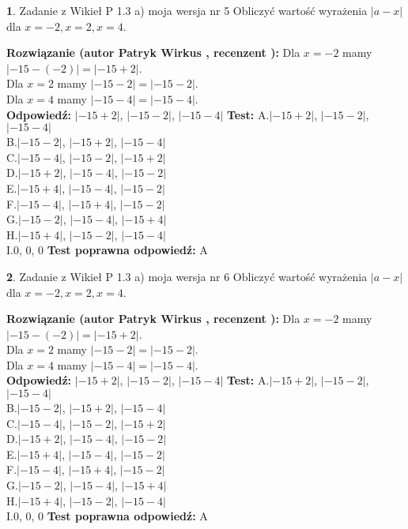 \documentclass[12pt, a4paper]{article}
\theoremstyle{definition} %
\newtheorem{zad}{}
\newcommand{\zadStart}[1]{\begin{zad}#1\newline}
\newcommand{\zadStop}{\end{zad}}
\newcommand{\rozwStart}[2]{\noindent \textbf{Rozwiązanie (autor #1 , recenzent #2): }\newline}
\newcommand{\rozwStop}{\newline}
\newcommand{\odpStart}{\noindent \textbf{Odpowiedź:}\newline}
\newcommand{\odpStop}{\newline}
\newcommand{\testStart}{\noindent \textbf{Test:}\newline}
\newcommand{\testStop}{\newline}
\newcommand{\kluczStart}{\noindent \textbf{Test poprawna odpowiedź:}\newline}
\newcommand{\kluczStop}{\newline}
\begin{document}
\zadStart{Zadanie z Wikieł P 1.3 a) moja wersja nr 5}
Obliczyć wartość wyrażenia $|a - x|$ dla $x=-2,x=2,x=4$.
\zadStop
\rozwStart{Patryk Wirkus}{}
Dla $x = -2$ mamy $|-15 - (-2)| = |-15 + 2|$.\\
Dla $x = 2$ mamy $|-15 - 2| = |-15 - 2|$.\\
Dla $x = 4$ mamy $|-15 - 4| = |-15 - 4|$.\\
\rozwStop
\odpStart
$|-15 + 2|$, $|-15 - 2|$, $|-15 - 4|$
\odpStop
\testStart
A.$|-15 + 2|$, $|-15 - 2|$, $|-15 - 4|$\\
B.$|-15 - 2|$, $|-15 + 2|$, $|-15 - 4|$\\
C.$|-15 - 4|$, $|-15 - 2|$, $|-15 + 2|$\\
D.$|-15 + 2|$, $|-15 - 4|$, $|-15 - 2|$\\
E.$|-15 + 4|$, $|-15 - 4|$, $|-15 - 2|$\\
F.$|-15 - 4|$, $|-15 + 4|$, $|-15 - 2|$\\
G.$|-15 - 2|$, $|-15 - 4|$, $|-15 + 4|$\\
H.$|-15 + 4|$, $|-15 - 2|$, $|-15 - 4|$\\
I.$0$, $0$, $0$
\testStop
\kluczStart
A
\kluczStop



\zadStart{Zadanie z Wikieł P 1.3 a) moja wersja nr 6}
Obliczyć wartość wyrażenia $|a - x|$ dla $x=-2,x=2,x=4$.
\zadStop
\rozwStart{Patryk Wirkus}{}
Dla $x = -2$ mamy $|-15 - (-2)| = |-15 + 2|$.\\
Dla $x = 2$ mamy $|-15 - 2| = |-15 - 2|$.\\
Dla $x = 4$ mamy $|-15 - 4| = |-15 - 4|$.\\
\rozwStop
\odpStart
$|-15 + 2|$, $|-15 - 2|$, $|-15 - 4|$
\odpStop
\testStart
A.$|-15 + 2|$, $|-15 - 2|$, $|-15 - 4|$\\
B.$|-15 - 2|$, $|-15 + 2|$, $|-15 - 4|$\\
C.$|-15 - 4|$, $|-15 - 2|$, $|-15 + 2|$\\
D.$|-15 + 2|$, $|-15 - 4|$, $|-15 - 2|$\\
E.$|-15 + 4|$, $|-15 - 4|$, $|-15 - 2|$\\
F.$|-15 - 4|$, $|-15 + 4|$, $|-15 - 2|$\\
G.$|-15 - 2|$, $|-15 - 4|$, $|-15 + 4|$\\
H.$|-15 + 4|$, $|-15 - 2|$, $|-15 - 4|$\\
I.$0$, $0$, $0$
\testStop
\kluczStart
A
\kluczStop
\end{document}
